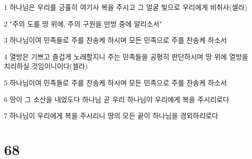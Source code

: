 \par 1 하나님은 우리를 긍휼히 여기사 복을 주시고 그 얼굴 빛으로 우리에게 비취사(셀라)
\par 2 "주의 도를 땅 위에, 주의 구원을 만방 중에 알리소서"
\par 3 하나님이여 민족들로 주를 찬송케 하시며 모든 민족으로 주를 찬송케 하소서
\par 4 열방은 기쁘고 즐겁게 노래할지니 주는 민족들을 공평히 판단하시며 땅 위에 열방을 치리하실 것임이니이다(셀라)
\par 5 하나님이여 민족들로 주를 찬송케 하시며 모든 민족으로 주를 찬송케 하소서
\par 6 땅이 그 소산을 내었도다 하나님 곧 우리 하나님이 우리에게 복을 주시리로다
\par 7 하나님이 우리에게 복을 주시리니 땅의 모든 끝이 하나님을 경외하리로다

\chapter{68}

